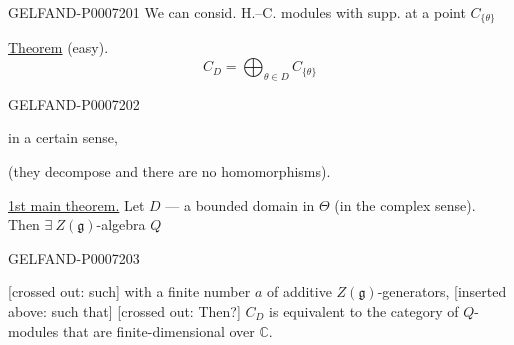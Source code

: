 \begin{GelfandAdjacentEvidence}{GELFAND-P000720}{1}
We can consid. H.–C. modules with supp. at a point \(C_{\{\theta\}}\)

\underline{Theorem} (easy).
\[
C_D=\bigoplus_{\theta\in D}C_{\{\theta\}}
\]
\end{GelfandAdjacentEvidence}
\begin{GelfandAdjacentEvidence}{GELFAND-P000720}{2}

in a certain sense,

(they decompose and there are no homomorphisms).

\underline{1st main theorem.} Let \(D\) --- a bounded domain in \(\Theta\)
(in the complex sense). Then \(\exists\ Z(\mathfrak g)\)-algebra \(Q\)
\end{GelfandAdjacentEvidence}
\begin{GelfandAdjacentEvidence}{GELFAND-P000720}{3}

[crossed out: such] with a finite number \(a\) of additive \(Z(\mathfrak g)\)-generators,
[inserted above: such that] [crossed out: Then?]
\(C_D\) is equivalent to the category of \(Q\)-modules that are finite-dimensional over \(\mathbb C\).
\end{GelfandAdjacentEvidence}
